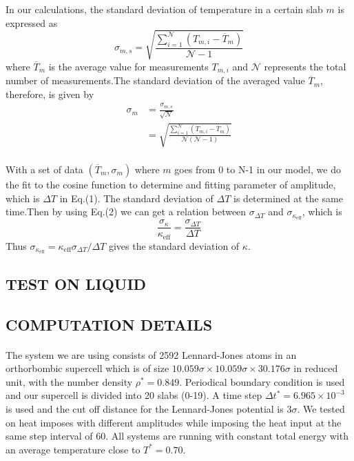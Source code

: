 \documentclass[twocolumn]{article}
\author{}
\begin{document}
In our calculations, the standard deviation of temperature in a certain slab $m$ is expressed as
\begin{equation}
\sigma_{m,s}=\sqrt{\frac{\sum\limits_{i=1}^\mathcal{N}\left( T_{m,i}-\overline{T}_m\right)}{\mathcal{N}-1}}
\end{equation}
where $\overline{T}_m$ is the average value for measurements $T_{m,i}$ and $\mathcal{N}$ represents the total number of measurements.The standard deviation of the averaged value $\overline{T}_m$, therefore, is given by
\begin{align}
\sigma_m &=\frac{\sigma_{m,s}}{\sqrt{\mathcal{N}}}\\
&=\sqrt{\frac{\sum\limits_{i=1}^\mathcal{N}\left( T_{m,i}-\overline{T}_m\right)}{\mathcal{N}(\mathcal{N}-1)}}
\end{align}
\paragraph*{}
With a set of data $(\overline{T}_m,\sigma_m)$ where $m$ goes from 0 to N-1 in our model, we do the fit to the cosine function to determine and fitting parameter of amplitude, which is $\Delta T$ in Eq.(1). The standard deviation of $\Delta T$ is determined at the same time.Then by using Eq.(2) we can get a relation between $\sigma_{\Delta T}$ and $\sigma_{\kappa_{\mbox{eff}}}$, which is
\begin{equation}
\frac{\sigma_{\kappa}}{\kappa_{\mbox{eff}}}=\frac{\sigma_{\Delta T}}{\Delta T}
\end{equation}
Thus $\sigma_{\kappa_{\mbox{eff}}}=\kappa_{\mbox{eff}}\sigma_{\Delta{T}}/\Delta{T}$ gives the standard deviation of $\kappa$.
\setcounter{section}{2}
\begin{center}
\section{TEST ON LIQUID}
\end{center}
\setcounter{equation}{9}
\subsection*{COMPUTATION DETAILS}
\paragraph*{}
The system we are using consists of 2592 Lennard-Jones atoms in an orthorbombic supercell which is of size $10.059\sigma\times10.059\sigma\times30.176\sigma$ in reduced unit, with the number density $\rho^*=0.849$. Periodical boundary condition is used and our supercell is divided into 20 slabs (0-19). A time step $\Delta t^*=6.965\times10^{-3}$ is used and the cut off distance for the Lennard-Jones potential is $3\sigma$. We tested on heat imposes with different amplitudes while imposing the heat input at the same step interval of 60. All systems are running with constant total energy with an average temperature close to $T^*=0.70$.
\end{document}

